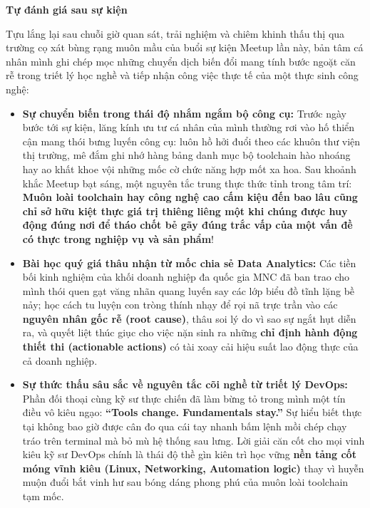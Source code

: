 \vspace{0.5em}\noindent\textbf{Tự đánh giá sau sự
kiện}\par

Tựu lắng lại sau chuỗi giờ quan sát, trải nghiệm và chiêm khinh thấu thị
qua trường cọ xát bùng rạng muôn mầu của buổi sự kiện Meetup lần này,
bản tâm cá nhân mình ghi chép mọc những chuyển dịch biến đổi mang tính
bước ngoặt căn rễ trong triết lý học nghề và tiếp nhận công việc thực tế
của một thực sinh công nghệ:

\begin{itemize}
\tightlist
\item
  \textbf{Sự chuyển biến trong thái độ nhắm ngắm bộ công cụ:} Trước ngày
  bước tới sự kiện, lăng kính ưu tư cá nhân của mình thường rơi vào hố
  thiển cận mang thói bưng luyến công cụ: luôn hồ hởi đuổi theo các
  khuôn thư viện thị trường, mê đắm ghi nhớ hàng bảng danh mục bộ
  toolchain hào nhoáng hay ao khất khoe vội những mốc cờ chức năng hợp
  mốt xa hoa. Sau khoảnh khắc Meetup bạt sáng, một nguyên tắc trung thực
  thức tỉnh trong tâm trí: \textbf{Muôn loài toolchain hay công nghệ cao
  cấm kiệu đến bao lâu cũng chỉ sở hữu kiệt thực giá trị thiêng liêng
  một khi chúng được huy động đúng nơi để tháo chốt bẻ gãy đúng trắc vấp
  của một vấn đề có thực trong nghiệp vụ và sản phẩm}!
\item
  \textbf{Bài học quý giá thâu nhận từ mốc chia sẻ Data Analytics:} Các
  tiền bối kinh nghiệm của khối doanh nghiệp đa quốc gia MNC đã ban trao
  cho mình thói quen gạt văng nhãn quang luyến say các lớp biểu đồ tĩnh
  lặng bề nảy; học cách tu luyện con tròng thính nhạy để rọi nã trực
  trần vào các \textbf{nguyên nhân gốc rễ (root cause)}, thâu soi lý do
  vì sao sự ngắt hụt diễn ra, và quyết liệt thúc giục cho việc nặn sinh
  ra những \textbf{chỉ định hành động thiết thi (actionable actions)} có
  tài xoay cải hiệu suất lao động thực của cả doanh nghiệp.
\item
  \textbf{Sự thức thấu sâu sắc về nguyên tắc cõi nghề từ triết lý
  DevOps:} Phần đối thoại cùng kỹ sư thực chiến đã làm bừng tỏ trong
  mình một tín điều vô kiêu ngạo: \textbf{``Tools change. Fundamentals
  stay.''} Sự hiểu biết thực tại không bao giờ được cân đo qua cái tay
  nhanh bấm lệnh mồi chép chạy tráo trên terminal mà bỏ mù hệ thống sau
  lưng. Lời giải căn cốt cho mọi vinh kiêu kỹ sư DevOps chính là thái độ
  thề gìn kiên trì học vững \textbf{nền tảng cốt móng vĩnh kiêu (Linux,
  Networking, Automation logic)} thay vì huyễn muộn đuổi bắt vinh hư sau
  bóng dáng phong phú của muôn loài toolchain tạm mốc.

\end{itemize}
